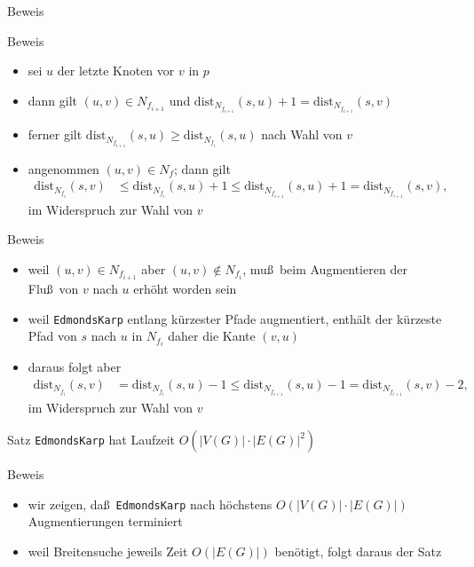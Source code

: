 \documentclass[aspectratio=1610, 11pt]{beamer}
\newcommand\dist{\mathrm{dist}}
\begin{document}
\begin{frame}
\begin{overprint}
\begin{exampleblock}{Beweis}
		\end{exampleblock}
		\begin{exampleblock}{Beweis}
			\begin{itemize}
				\item sei $u$ der letzte Knoten vor $v$ in $p$
				\item dann gilt $(u,v)\in N_{f_{i+1}}$ und $\dist_{N_{f_{i+1}}}(s,u)+1=\dist_{N_{f_{i+1}}}(s,v)$
				\item ferner gilt $\dist_{N_{f_{i+1}}}(s,u)\geq\dist_{N_{f_{i}}}(s,u)$ nach Wahl von $v$
				\item angenommen $(u,v)\in N_f$; dann gilt
					\begin{align*}
						\dist_{N_{f_{i}}}(s,v)&\leq\dist_{N_{f_{i}}}(s,u)+1\leq\dist_{N_{f_{i+1}}}(s,u)+1=\dist_{N_{f_{i+1}}}(s,v),
					\end{align*}
					im Widerspruch zur Wahl von $v$
			\end{itemize}
		\end{exampleblock}
		\begin{exampleblock}{Beweis}
			\begin{itemize}
				\item weil $(u,v)\in N_{f_{i+1}}$ aber $(u,v)\not\in N_{f_i}$, mu\ss\ beim Augmentieren der Flu\ss\ von $v$ nach $u$ erh\"oht worden sein
				\item weil {\tt EdmondsKarp} entlang k\"urzester Pfade augmentiert, enth\"alt der k\"urzeste Pfad von $s$ nach $u$ in $N_{f_i}$ daher die Kante $(v,u)$
				\item daraus folgt aber
					\begin{align*}
						\dist_{N_{f_{i}}}(s,v)&=\dist_{N_{f_{i}}}(s,u)-1\leq\dist_{N_{f_{i+1}}}(s,u)-1=\dist_{N_{f_{i+1}}}(s,v)-2,
					\end{align*}
					im Widerspruch zur Wahl von $v$
			\end{itemize}
		\end{exampleblock}
		\begin{block}{Satz}
			{\tt EdmondsKarp} hat Laufzeit $O(|V(G)|\cdot|E(G)|^2)$
		\end{block}
		\begin{exampleblock}{Beweis}
			\begin{itemize}
				\item wir zeigen, da\ss\ {\tt EdmondsKarp} nach h\"ochstens $O(|V(G)|\cdot|E(G)|)$ Augmentierungen terminiert
				\item weil Breitensuche jeweils Zeit $O(|E(G)|)$ ben\"otigt, folgt daraus der Satz

\end{itemize}
\end{exampleblock}
\end{overprint}
\end{frame}
\end{document}
